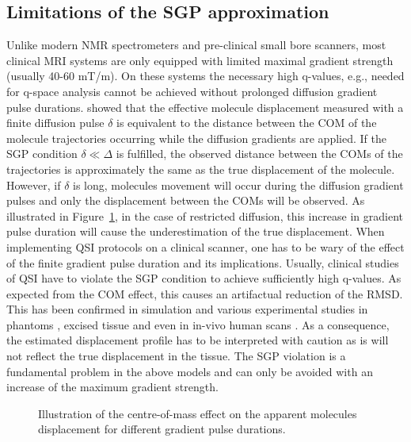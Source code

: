 \subsection{Limitations of the SGP approximation}
Unlike modern NMR spectrometers and pre-clinical small bore scanners, most clinical MRI systems are only equipped with limited maximal gradient strength (usually 40-60 mT/m). On these systems the necessary high q-values, e.g., needed for q-space analysis cannot be achieved without prolonged diffusion gradient pulse durations. \citep{Mitra:1995} showed that the effective molecule displacement measured with a finite diffusion pulse $\delta$ is equivalent to the distance between the \gls{COM} of the molecule trajectories occurring while the diffusion gradients are applied. If the \gls{SGP} condition $ \delta \ll \Delta$ is fulfilled, the observed distance between the \glspl{COM} of the trajectories is approximately the same as the true displacement of the molecule. However, if $\delta$ is long, molecules movement will occur during the diffusion gradient pulses and only the displacement between the \gls{COM}s will be observed. As illustrated in Figure~\ref{fig:chapter2 com effect}, in the case of restricted diffusion, this increase in gradient pulse duration will cause the underestimation of the true displacement. 
When implementing QSI protocols on a clinical scanner, one has to be wary of the effect of the finite gradient pulse duration and its implications. Usually, clinical studies of QSI have to violate the \gls{SGP} condition to achieve sufficiently high q-values. As expected from the \gls{COM} effect, this causes an artifactual reduction of the \gls{RMSD}. This has been confirmed in simulation \citep{Linse:1995,Laett:2007a} and various experimental studies in phantoms \citep{Avram:2004,Laett:2007}, excised tissue \citep{Malmborg:2006,Bar-Shir:2008} and even in in-vivo human scans \citep{Nilsson:2009}. As a consequence, the estimated displacement profile has to be interpreted with caution as is will not reflect the true displacement in the tissue. The \gls{SGP} violation is a fundamental problem in the above models and can only be avoided with an increase of the maximum gradient strength. 

\begin{figure}[htbp]
	\centering
	\caption{Illustration of the centre-of-mass effect on the apparent molecules displacement for different gradient pulse durations.}
	\label{fig:chapter2 com effect}
\end{figure}

